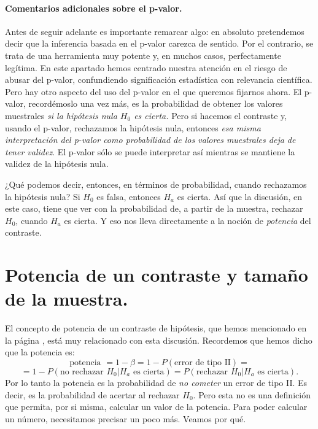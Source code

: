 \paragraph{Comentarios adicionales sobre el p-valor.}

Antes de seguir adelante es importante remarcar algo: en absoluto pretendemos decir que la inferencia basada en el p-valor carezca de sentido. Por el contrario, se trata de una herramienta muy potente y, en muchos casos,  perfectamente legítima.
En este apartado hemos centrado nuestra atención en el riesgo de abusar del p-valor, confundiendo significación estadística con relevancia científica. Pero hay otro aspecto del uso del p-valor en el que queremos fijarnos ahora. El p-valor, recordémoslo una vez más, es la probabilidad de obtener los valores muestrales {\em si la hipótesis nula $H_0$ es cierta.} Pero si hacemos el contraste y, usando el p-valor, rechazamos la hipótesis nula, entonces {\em esa misma interpretación del p-valor como probabilidad de los valores muestrales deja de tener validez}. El p-valor sólo se puede interpretar así mientras se mantiene la validez de la hipótesis nula.

¿Qué podemos decir, entonces, en términos de probabilidad, cuando rechazamos la hipótesis nula? Si $H_0$ es falsa, entonces $H_a$ es cierta. Así que la discusión, en este caso, tiene que ver con la probabilidad de, a partir de la muestra, rechazar $H_0$, cuando $H_a$ es cierta. Y eso nos lleva directamente a la noción de {\em potencia} del contraste.


\section{Potencia de un contraste y tamaño de la muestra.}
\label{cap07:sec:PotenciaContraste}


El concepto de {\sf potencia} de un contraste de hipótesis, que hemos mencionado en la página \pageref{cap07:ecu:BetaErrorTipoII}, está muy relacionado con esta discusión. Recordemos que hemos dicho que la potencia es:
\[\mbox{potencia } =  1-\beta=1-P(\mbox{error de tipo II})=\]
\[=1-P(\mbox{no rechazar }H_0 | H_a\mbox{ es cierta})=P(\mbox{rechazar }H_0 | H_a\mbox{ es cierta}).\]
Por lo tanto la potencia es la probabilidad de {\em no cometer} un error de tipo II. Es decir, es la probabilidad de acertar al rechazar $H_0$. Pero esta no es una definición que permita, por si misma, calcular un valor de la potencia. Para poder calcular un número, necesitamos precisar un poco más. Veamos por qué.

